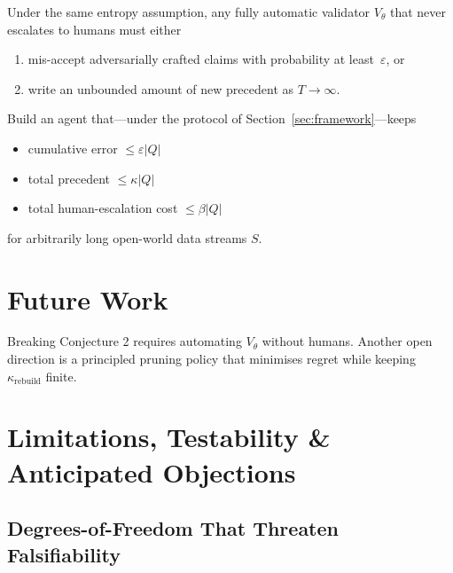 \documentclass[11pt]{article}
\begin{document}
\begin{conjecture}\label{conjecture2}
Under the same entropy assumption,
any fully automatic validator $V_\theta$ that never escalates to humans
must either
\begin{enumerate}[label=(\roman*)]
\item mis-accept adversarially crafted claims with probability at least~$\varepsilon$, or
\item write an unbounded amount of new precedent as $T\to\infty$.
\end{enumerate}
\end{conjecture}


\begin{tcolorbox}[title=Falsify-Us]
  Build an agent that—under the protocol of Section~\ref{sec:framework}—keeps
  \begin{itemize}
    \item cumulative error $\leq \varepsilon|Q|$
    \item total precedent $\leq \kappa|Q|$
    \item total human-escalation cost $\leq \beta|Q|$
  \end{itemize}
  for arbitrarily long open-world data streams $S$.
\end{tcolorbox}

\section{Future Work}
\label{sec:conclusion}
Breaking Conjecture 2 requires automating $V_\theta$ without humans. Another open direction is a principled pruning policy that minimises regret while keeping \(\kappa_{\text{rebuild}}\) finite.

\appendix
\section{Limitations, Testability \& Anticipated Objections}
\label{app:limits}

\subsection{\quad Degrees-of-Freedom That Threaten Falsifiability}
\label{sec:knobs}
\end{document}
